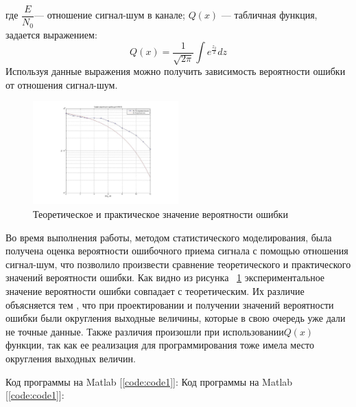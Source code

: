 где $\dfrac{E}{N_{0}}$--- отношение сигнал-шум в канале; $Q(x)$ --- табличная функция, задается выражением:
\begin{equation}
Q(x)=\dfrac{1}{\sqrt{2\pi}}\int e^{\frac{z_{2}}{2}}dz
\end{equation}
Используя данные выражения можно получить зависимость вероятности ошибки от отношения сигнал-шум.

 \begin{figure}[H]
	\centering
	\includegraphics[width=0.5\textwidth]{img/mal9}
	\caption{Теоретическое и практическое значение вероятности ошибки}
	\label{fig:mal9}
\end{figure}
Во время выполнения работы, методом статистического моделирования, была получена оценка вероятности ошибочного приема сигнала с помощью отношения сигнал-шум, что позволило произвести сравнение теоретического и практического значений вероятности ошибки.
Как видно из рисунка ~\ref{fig:mal9} экспериментальное значение вероятности ошибки совпадает с теоретическим.
Их различие объясняется тем , что при проектировании и получении значений вероятности ошибки были округления выходные величины, которые в свою очередь уже дали не точные данные. Также различия произошли при использовании$ Q(x)$ функции, так как ее реализация для программирования тоже имела место округления выходных величин.

Код программы на Matlab [\ref{code:code1}]: 
%
Код программы на Matlab [\ref{code:code1}]: 
%

